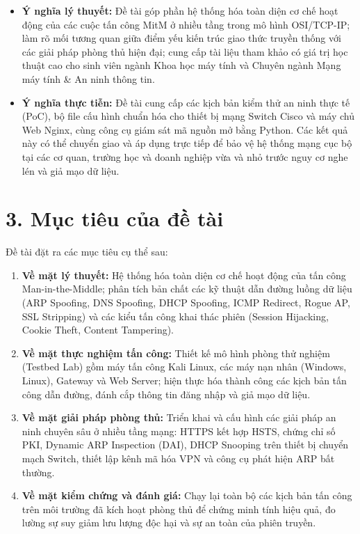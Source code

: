 \begin{itemize}
  \item \textbf{Ý nghĩa lý thuyết:} Đề tài góp phần hệ thống hóa toàn diện cơ chế hoạt động của các cuộc tấn công MitM ở nhiều tầng trong mô hình OSI/TCP-IP; làm rõ mối tương quan giữa điểm yếu kiến trúc giao thức truyền thống với các giải pháp phòng thủ hiện đại; cung cấp tài liệu tham khảo có giá trị học thuật cao cho sinh viên ngành Khoa học máy tính và Chuyên ngành Mạng máy tính \& An ninh thông tin.
  \item \textbf{Ý nghĩa thực tiễn:} Đề tài cung cấp các kịch bản kiểm thử an ninh thực tế (PoC), bộ file cấu hình chuẩn hóa cho thiết bị mạng Switch Cisco và máy chủ Web Nginx, cùng công cụ giám sát mã nguồn mở bằng Python. Các kết quả này có thể chuyển giao và áp dụng trực tiếp để bảo vệ hệ thống mạng cục bộ tại các cơ quan, trường học và doanh nghiệp vừa và nhỏ trước nguy cơ nghe lén và giả mạo dữ liệu.
\end{itemize}

\section*{3. Mục tiêu của đề tài}

Đề tài đặt ra các mục tiêu cụ thể sau:
\begin{enumerate}
  \item \textbf{Về mặt lý thuyết:} Hệ thống hóa toàn diện cơ chế hoạt động của tấn công Man-in-the-Middle; phân tích bản chất các kỹ thuật dẫn đường luồng dữ liệu (ARP Spoofing, DNS Spoofing, DHCP Spoofing, ICMP Redirect, Rogue AP, SSL Stripping) và các kiểu tấn công khai thác phiên (Session Hijacking, Cookie Theft, Content Tampering).
  \item \textbf{Về mặt thực nghiệm tấn công:} Thiết kế mô hình phòng thử nghiệm (Testbed Lab) gồm máy tấn công Kali Linux, các máy nạn nhân (Windows, Linux), Gateway và Web Server; hiện thực hóa thành công các kịch bản tấn công dẫn đường, đánh cắp thông tin đăng nhập và giả mạo dữ liệu.
  \item \textbf{Về mặt giải pháp phòng thủ:} Triển khai và cấu hình các giải pháp an ninh chuyên sâu ở nhiều tầng mạng: HTTPS kết hợp HSTS, chứng chỉ số PKI, Dynamic ARP Inspection (DAI), DHCP Snooping trên thiết bị chuyển mạch Switch, thiết lập kênh mã hóa VPN và công cụ phát hiện ARP bất thường.
  \item \textbf{Về mặt kiểm chứng và đánh giá:} Chạy lại toàn bộ các kịch bản tấn công trên môi trường đã kích hoạt phòng thủ để chứng minh tính hiệu quả, đo lường sự suy giảm lưu lượng độc hại và sự an toàn của phiên truyền.
\end{enumerate}

